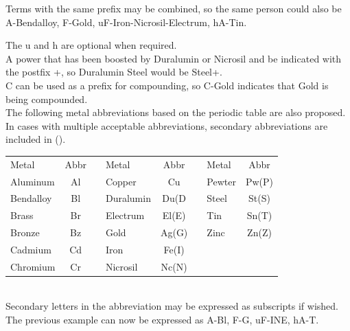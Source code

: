 \documentclass[conference]{IEEEtran}
\newcommand{\n}{\hfill\break}
\begin{document}
Terms with the same prefix may be combined, so the same person could also be A-Bendalloy, F-Gold, uF-Iron-Nicrosil-Electrum, hA-Tin.  

	
	


The u and h are optional when required.\\

A power that has been boosted by Duralumin or Nicrosil and be indicated with the postfix +, so Duralumin Steel would be Steel+. \\

C can be used as a prefix for compounding, so C-Gold indicates that Gold is being compounded.\\

The following metal abbreviations based on the periodic table are also proposed.  In cases with multiple acceptable abbreviations, secondary abbreviations are included in ().\\\n
\setlength{\tabcolsep}{.5\tabcolsep}
\begin{tabular}{|l |c |c|l |c |c|l |c | }
	
	\cline{1-2}\cline{4-5}\cline{7-8}
	Metal&Abbr&&Metal&Abbr&&Metal&Abbr\\
	\cline{1-2}\cline{4-5}\cline{7-8}
	
	\cline{1-2}\cline{4-5}\cline{7-8}
	Aluminum & Al&&  Copper & Cu && 	Pewter & Pw(P) \\ 
	\cline{1-2}\cline{4-5}\cline{7-8}
	Bendalloy & Bl && Duralumin &Du(D &&  	Steel & St(S)\\
	\cline{1-2}\cline{4-5}\cline{7-8}
	Brass & Br && Electrum& El(E) &&  Tin & Sn(T)\\
	\cline{1-2}\cline{4-5}\cline{7-8}
	Bronze & Bz &&	Gold&Ag(G)  &&Zinc & Zn(Z)  \\
	\cline{1-2}\cline{4-5}\cline{7-8}
Cadmium & Cd&&	Iron & Fe(I)  \\
	\cline{1-2}\cline{4-5}
	Chromium &Cr&& Nicrosil & Nc(N) \\
	\cline{1-2}\cline{4-5}
\end{tabular}\\

Secondary letters in the abbreviation may be expressed as subscripts if wished.
The previous example can now be expressed as A-Bl, F-G, uF-INE, hA-T.  

\newpage{}
{}


\clearpage
\onecolumn
\end{document}
